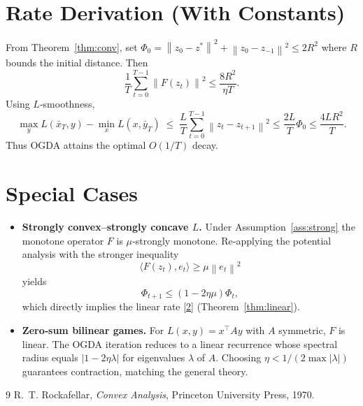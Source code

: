 \documentclass{article}
\newcommand{\norm}[1]{\left\|#1\right\|}
\newcommand{\inner}[2]{\langle #1,#2\rangle}
\begin{document}
\section*{Rate Derivation (With Constants)}
From Theorem~\ref{thm:conv}, set $\Phi_{0}= \norm{z_{0}-z^{*}}^{2}+\norm{z_{0}-z_{-1}}^{2}\le 2R^{2}$ where $R$ bounds the initial distance.  Then
\[
\frac{1}{T}\sum_{t=0}^{T-1}\norm{F(z_{t})}^{2}\le \frac{8R^{2}}{\eta T}.
\]
Using $L$‑smoothness,
\[
\max_{y}L(\bar x_{T},y)-\min_{x}L(x,\bar y_{T})
\;\le\; \frac{L}{T}\sum_{t=0}^{T-1}\norm{z_{t}-z_{t+1}}^{2}
\le \frac{2L}{T}\Phi_{0}
\le \frac{4LR^{2}}{T}.
\]
Thus OGDA attains the optimal $O(1/T)$ decay.

\section*{Special Cases}
\begin{itemize}
\item \textbf{Strongly convex–strongly concave $L$.}  Under Assumption~\ref{ass:strong} the monotone operator $F$ is $\mu$‑strongly monotone.  Re‑applying the potential analysis with the stronger inequality
\[
\inner{F(z_{t})}{e_{t}}\ge \mu\norm{e_{t}}^{2}
\]
yields
\[
\Phi_{t+1}\le (1-2\eta\mu)\Phi_{t},
\]
which directly implies the linear rate \eqref{2} (Theorem~\ref{thm:linear}).
\item \textbf{Zero‑sum bilinear games.}  For $L(x,y)=x^{\top}Ay$ with $A$ symmetric, $F$ is linear.  The OGDA iteration reduces to a linear recurrence whose spectral radius equals $|1-2\eta\lambda|$ for eigenvalues $\lambda$ of $A$.  Choosing $\eta<1/(2\max|\lambda|)$ guarantees contraction, matching the general theory.
\end{itemize}

\begin{thebibliography}{9}
R.~T. Rockafellar, \emph{Convex Analysis}, Princeton University Press, 1970.
\end{thebibliography}
\end{document}
